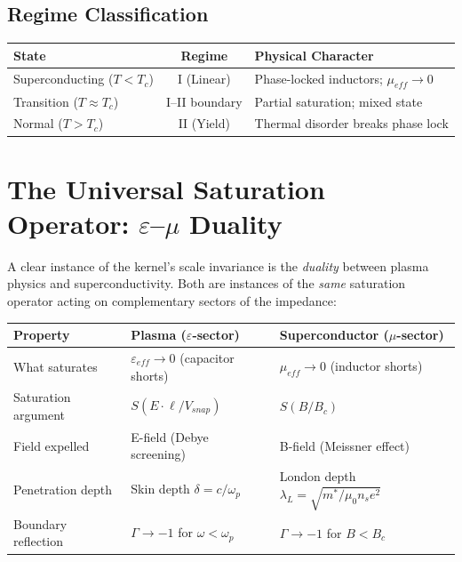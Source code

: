 \subsection*{Regime Classification}
\begin{center}
\small
\renewcommand{\arraystretch}{1.2}
\begin{tabularx}{\textwidth}{@{}lcX@{}}
\toprule
\textbf{State} & \textbf{Regime} & \textbf{Physical Character} \\
\midrule
Superconducting ($T < T_c$) & I (Linear) & Phase-locked inductors; $\mu_{eff} \to 0$ \\
Transition ($T \approx T_c$)      & I--II boundary & Partial saturation; mixed state \\
Normal ($T > T_c$)                 & II (Yield) & Thermal disorder breaks phase lock \\
\bottomrule
\end{tabularx}
\end{center}

\section{The Universal Saturation Operator: $\varepsilon$--$\mu$ Duality}
\label{sec:superconductivity_duality}

A clear instance of the kernel's scale invariance is the
\textit{duality} between plasma physics and superconductivity.
Both are instances of the \textit{same} saturation operator acting
on complementary sectors of the impedance:

\begin{center}
\small
\renewcommand{\arraystretch}{1.2}
\begin{tabularx}{\textwidth}{@{}llX@{}}
\toprule
\textbf{Property} & \textbf{Plasma ($\varepsilon$-sector)} & \textbf{Superconductor ($\mu$-sector)} \\
\midrule
What saturates      & $\varepsilon_{eff} \to 0$ (capacitor shorts)
                    & $\mu_{eff} \to 0$ (inductor shorts) \\
Saturation argument & $S(E \cdot \ell / V_{snap})$
                    & $S(B / B_c)$ \\
Field expelled      & E-field (Debye screening)
                    & B-field (Meissner effect) \\
Penetration depth   & Skin depth $\delta = c/\omega_p$
                    & London depth $\lambda_L = \sqrt{m^*/\mu_0 n_s e^2}$ \\
Boundary reflection & $\Gamma \to -1$\gammaundeclared{} for $\omega < \omega_p$
                    & $\Gamma \to -1$\gammaundeclared{} for $B < B_c$ \\
\bottomrule
\end{tabularx}
\end{center}

